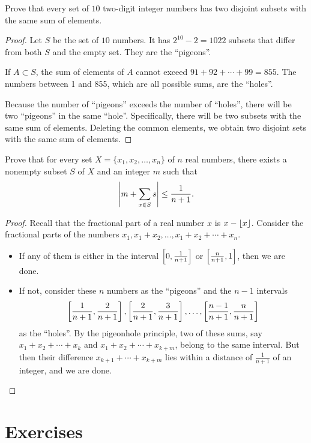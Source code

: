 \begin{example}[IMO 1972]
Prove that every set of $10$ two-digit integer numbers has two disjoint subsets with the same sum of elements.

\begin{proof}
Let $S$ be the set of $10$ numbers. It has $2^{10}-2=1022$ subsets that differ from both $S$ and the empty set. They are the ``pigeons''.

If $A\subset S$, the sum of elements of $A$ cannot exceed $91+92+\cdots+99=855$. The numbers between 1 and 855, which are all possible sums, are the ``holes''.

Because the number of ``pigeons'' exceeds the number of ``holes'', there will be two ``pigeons'' in the same ``hole''. Specifically, there will be two subsets with the same sum of elements. Deleting the common elements, we obtain two disjoint sets with the same sum of elements.
\end{proof}
\end{example}

\begin{example}[Putnam 2006]
Prove that for every set $X=\{x_1,x_2,\dots,x_n\}$ of $n$ real numbers, there exists a nonempty subset $S$ of $X$ and an integer $m$ such that
\[\left|m+\sum_{x\in S}s\right|\le\frac{1}{n+1}.\]

\begin{proof}
Recall that the fractional part of a real number $x$ is $x-\left\lfloor x \right\rfloor$. Consider the fractional parts of the numbers $x_1,x_1+x_2,\dots,x_1+x_2+\cdots+x_n$.
\begin{itemize}
\item If any of them is either in the interval $\left[0,\frac{1}{n+1}\right]$ or $\left[\frac{n}{n+1},1\right]$, then we are done.
\item If not, consider these $n$ numbers as the ``pigeons'' and the $n-1$ intervals
\[\left[\frac{1}{n+1},\frac{2}{n+1}\right],\left[\frac{2}{n+1},\frac{3}{n+1}\right],\dots,\left[\frac{n-1}{n+1},\frac{n}{n+1}\right]\]
as the ``holes''. By the pigeonhole principle, two of these sums, say $x_1+x_2+\cdots+x_k$ and $x_1+x_2+\cdots+x_{k+m}$, belong to the same interval. But then their difference $x_{k+1}+\cdots+x_{k+m}$ lies within a distance of $\frac{1}{n+1}$ of an integer, and we are done.
\end{itemize}
\end{proof}
\end{example}


\pagebreak

\section*{Exercises}

